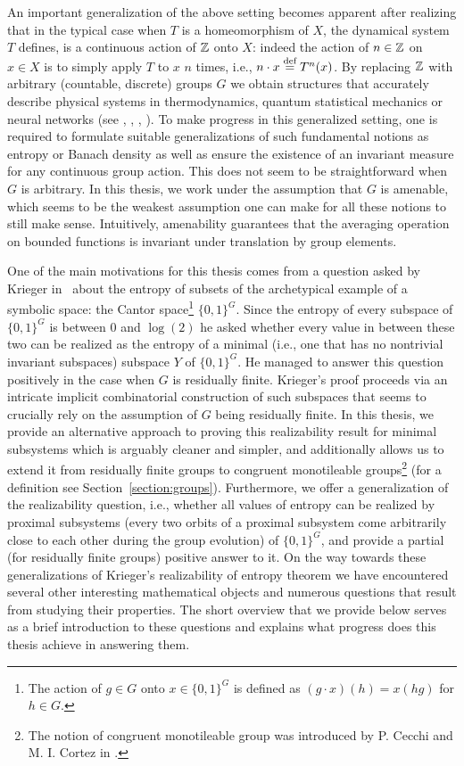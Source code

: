 An important generalization of the above setting becomes apparent after realizing that in the typical case when $T$ is a homeomorphism of $X$, the dynamical system $T$ defines, is a continuous action of $\mathbb{Z}$ onto $X$: indeed the action of $n\in \mathbb{Z}$ on $x\in X$ is to simply apply $T$ to $x$ $n$ times, i.e., $n\cdot x \stackrel{\textup{def}}{=} T^n(x)$.
%
By replacing $\mathbb{Z}$ with arbitrary (countable, discrete) groups $G$ we obtain structures that accurately describe physical systems in thermodynamics, quantum statistical mechanics or neural networks  (see \cite{Ruelle04}, \cite{HM10}, \cite{Emch14}, \cite{EL02}).
%
To make progress in this generalized setting, one is required to formulate suitable generalizations of such fundamental notions as entropy or Banach density as well as ensure the existence of an invariant measure for any continuous group action. This does not seem to be straightforward when $G$ is arbitrary.
%
In this thesis, we work under the assumption that $G$ is amenable, which seems to be the weakest assumption one can make for all these notions to still make sense.
%
Intuitively, amenability guarantees that the averaging operation on bounded functions is invariant under translation by group elements.
%

One of the main motivations for this thesis comes from a question asked by Krieger in~\cite{Krieger07} about the entropy of subsets of the archetypical example of a symbolic space: the Cantor space\footnote{The action of $g\in G$ onto $x\in \{0,1\}^G$ is defined as $(g\cdot x)(h) = x(hg)$ for $h\in G$.} $\{0,1\}^G$.
%
Since the entropy of every subspace of $\{0,1\}^G$ is between $0$ and $\log(2)$ he asked whether every value in between these two can be realized as the entropy of a minimal (i.e., one that has no nontrivial invariant subspaces) subspace $Y$ of $\{0,1\}^G$.
%
He managed to answer this question positively in the case when $G$ is residually finite.
%
Krieger's proof proceeds via an intricate implicit combinatorial construction of such subspaces that seems to crucially rely on the assumption of $G$ being residually finite.
%
In this thesis, we provide an alternative approach to proving this realizability result for minimal subsystems which is arguably cleaner and simpler, and additionally allows us to extend it from residually finite groups to congruent monotileable groups\footnote{The notion of congruent monotileable group was introduced by P. Cecchi and M. I. Cortez in \cite{CC19}.} (for a definition see Section~\ref{section:groups}).
%
Furthermore, we offer a generalization of the realizability question, i.e., whether all values of entropy can be realized by proximal subsystems (every two orbits of a proximal subsystem come arbitrarily close to each other during the group evolution) of $\{0,1\}^G$, and provide a partial (for residually finite groups) positive answer to it.
%
On the way towards these generalizations of Krieger's realizability of entropy theorem we have encountered several other interesting mathematical objects and numerous questions that result from studying their properties.
%
The short overview that we provide below serves as a brief introduction to these questions and explains what progress does this thesis achieve in answering them.
%


